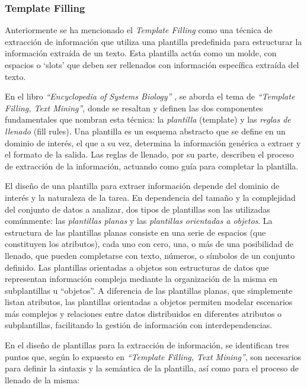 \subsubsection{Template Filling}\label{section: templateFilling}
Anteriormente se ha mencionado el \textit{Template Filling} como una técnica de extracción 
de información que utiliza una plantilla predefinida para estructurar la información 
extraída de un texto. Esta plantilla actúa como un molde, con espacios o `slots' que 
deben ser rellenados con información específica extraída del texto.

En el libro \textit{``Encyclopedia of Systems Biology''} \cite{Raja2013}, se aborda el 
tema de \textit{``Template Filling, Text Mining''}, donde se resaltan y definen las 
dos componentes fundamentales que nombran esta técnica: la \textit{plantilla} (template) 
y las \textit{reglas de llenado} (fill rules). Una plantilla es un esquema abstracto 
que se define en un dominio de interés, el que a su vez, determina la información 
genérica a extraer y el formato de la salida. Las reglas de llenado, por su parte, 
describen el proceso de extracción de la información, actuando como guía para 
completar la plantilla.

El diseño de una plantilla para extraer información depende del dominio de interés 
y la naturaleza de la tarea. En dependencia del tamaño y la complejidad del 
conjunto de datos a analizar, dos tipos de plantillas son las utilizadas comúnmente: 
las \textit{plantillas planas} y las \textit{plantillas orientadas a objetos}. 
La estructura de las plantillas planas consiste en una serie de espacios 
(que constituyen los atributos), cada uno con cero, una, o más de una posibilidad 
de llenado, que pueden completarse con texto, números, o símbolos de un conjunto definido. 
Las plantillas orientadas a objetos son estructuras de datos que representan información 
compleja mediante la organización de la misma en subplantillas u ``objetos''. 
A diferencia de las plantillas planas, que simplemente listan atributos, las plantillas 
orientadas a objetos permiten modelar escenarios más complejos y relaciones entre 
datos distribuidos en diferentes atributos o subplantillas, facilitando la gestión 
de información con interdependencias.

En el diseño de plantillas para la extracción de información, se identifican tres 
puntos que, según lo expuesto en \textit{``Template Filling, Text Mining''}, son 
necesarios para definir la sintaxis y la semántica de la plantilla, así como para 
el proceso de llenado de la misma:


